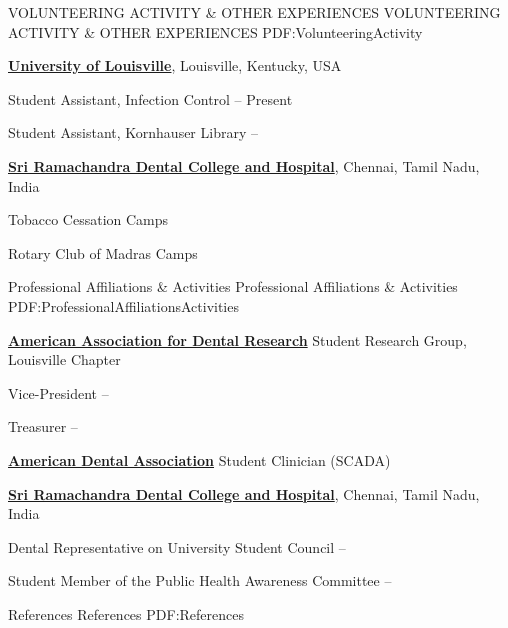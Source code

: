 \documentclass[letterpaper,MMMyyyy,nonstopmode]{simpleresumecv}
\newcommand{\uLouisville}{\href{http://louisville.edu/dentistry}
{\textbf{University of Louisville}},
Louisville, Kentucky, USA}
\newcommand{\ramachandra}{\href{http://www.sriramachandra.edu.in/}
{\textbf{Sri Ramachandra Dental College and Hospital}},
Chennai, Tamil Nadu, India}
\begin{document}
\begin{Body}
\Section
{VOLUNTEERING ACTIVITY \& OTHER EXPERIENCES}
{VOLUNTEERING ACTIVITY \& OTHER EXPERIENCES}
{PDF:VolunteeringActivity}

\Entry
\uLouisville

\Gap
\BulletItem
Student Assistant, Infection Control
\hfill
{} --
Present

\Gap
\BulletItem
Student Assistant, Kornhauser Library
\hfill
{} --

\BigGap
\Entry
\ramachandra

\Gap
\BulletItem
Tobacco Cessation Camps
\hfill
{} 

\Gap
\BulletItem
Rotary Club of Madras Camps
\hfill
{} 


\Section
{Professional Affiliations\newline
\& Activities}
{Professional Affiliations \& Activities}
{PDF:ProfessionalAffiliationsActivities}

\Entry
\href{http://www.aadronline.org/}
{\textbf{American Association for Dental Research}}
\newline
Student Research Group, Louisville Chapter

\Gap
\BulletItem
Vice-President
\hfill
{} --

\Gap
\BulletItem
Treasurer
\hfill
{} --

\BigGap
\Entry
\href{http://www.scadaresearch.org/us}
{\textbf{American Dental Association}}
\newline
Student Clinician (SCADA)

\BigGap
\Entry
\ramachandra

\Gap
\BulletItem
Dental Representative on University Student Council
\hfill
{} --

\Gap
\BulletItem
Student Member of the Public Health Awareness Committee
\hfill
{} --


\Section
 {References}
 {References}
 {PDF:References}


\end{Body}
\end{document}
